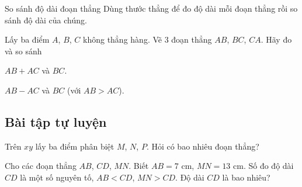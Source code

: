 	\begin{dang}{So sánh độ dài đoạn thẳng}
		Dùng thước thẳng để đo độ dài mỗi đoạn thẳng rồi so sánh độ dài của chúng.
	\end{dang}
	\begin{vd}
		Lấy ba điểm $ A $, $ B $, $ C $ không thẳng hàng. Vẽ $ 3 $ đoạn thẳng $ AB $, $ BC $, $ CA $. Hãy đo và so sánh
		\begin{enumEX}{2}
			\item $ AB + AC $ và $ BC $.
			\item $ AB - AC $ và $ BC $ (với $ AB > AC $).
		\end{enumEX}
	\end{vd}
	
	
	\subsection{Bài tập tự luyện}
	\begin{bt}%
		Trên $ xy $ lấy ba điểm phân biệt $ M $, $ N $, $ P $. Hỏi có bao nhiêu đoạn thẳng?
	\end{bt}

	\begin{bt}%
		Cho các đoạn thẳng $ AB $, $ CD $, $ MN $. Biết $ AB = 7 $ cm, $ MN = 13 $ cm. Số đo độ dài $ CD $ là một số nguyên tố, $ AB < CD $, $ MN > CD $. Độ dài $ CD $ là bao nhiêu?
	\end{bt}

